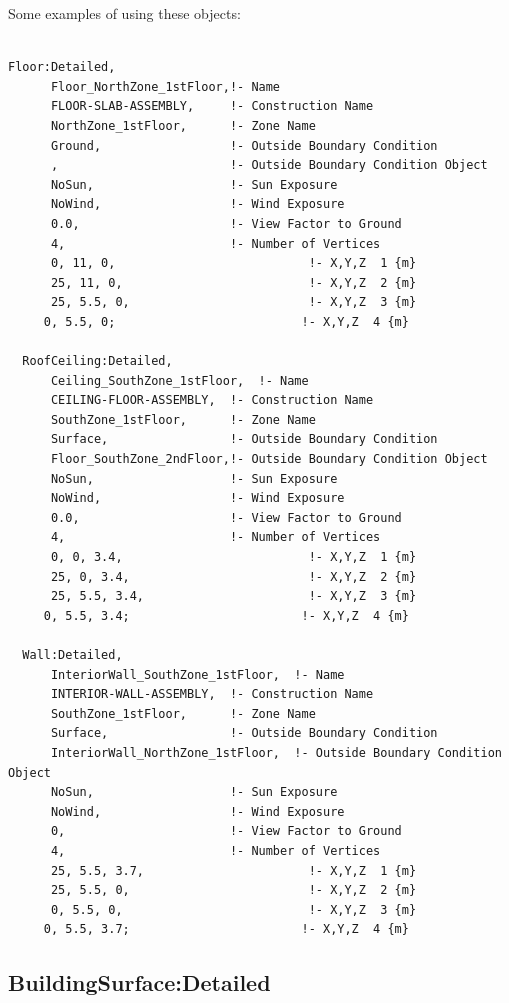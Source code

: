 Some examples of using these objects:

\begin{lstlisting}

Floor:Detailed,
      Floor_NorthZone_1stFloor,!- Name
      FLOOR-SLAB-ASSEMBLY,     !- Construction Name
      NorthZone_1stFloor,      !- Zone Name
      Ground,                  !- Outside Boundary Condition
      ,                        !- Outside Boundary Condition Object
      NoSun,                   !- Sun Exposure
      NoWind,                  !- Wind Exposure
      0.0,                     !- View Factor to Ground
      4,                       !- Number of Vertices
      0, 11, 0,                           !- X,Y,Z  1 {m}
      25, 11, 0,                          !- X,Y,Z  2 {m}
      25, 5.5, 0,                         !- X,Y,Z  3 {m}
     0, 5.5, 0;                          !- X,Y,Z  4 {m}

  RoofCeiling:Detailed,
      Ceiling_SouthZone_1stFloor,  !- Name
      CEILING-FLOOR-ASSEMBLY,  !- Construction Name
      SouthZone_1stFloor,      !- Zone Name
      Surface,                 !- Outside Boundary Condition
      Floor_SouthZone_2ndFloor,!- Outside Boundary Condition Object
      NoSun,                   !- Sun Exposure
      NoWind,                  !- Wind Exposure
      0.0,                     !- View Factor to Ground
      4,                       !- Number of Vertices
      0, 0, 3.4,                          !- X,Y,Z  1 {m}
      25, 0, 3.4,                         !- X,Y,Z  2 {m}
      25, 5.5, 3.4,                       !- X,Y,Z  3 {m}
     0, 5.5, 3.4;                        !- X,Y,Z  4 {m}

  Wall:Detailed,
      InteriorWall_SouthZone_1stFloor,  !- Name
      INTERIOR-WALL-ASSEMBLY,  !- Construction Name
      SouthZone_1stFloor,      !- Zone Name
      Surface,                 !- Outside Boundary Condition
      InteriorWall_NorthZone_1stFloor,  !- Outside Boundary Condition Object
      NoSun,                   !- Sun Exposure
      NoWind,                  !- Wind Exposure
      0,                       !- View Factor to Ground
      4,                       !- Number of Vertices
      25, 5.5, 3.7,                       !- X,Y,Z  1 {m}
      25, 5.5, 0,                         !- X,Y,Z  2 {m}
      0, 5.5, 0,                          !- X,Y,Z  3 {m}
     0, 5.5, 3.7;                        !- X,Y,Z  4 {m}
\end{lstlisting}

\subsection{BuildingSurface:Detailed}\label{buildingsurfacedetailed}

